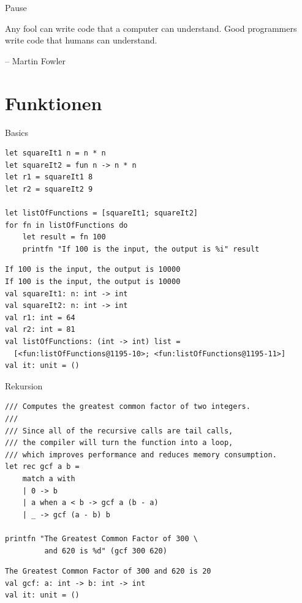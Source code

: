 \documentclass[t]{beamer}
\begin{document}
\begin{frame}[label={sec:org298f164}]{Pause}
\begin{block}{}
Any fool can write code that a computer can understand. 
Good programmers write code that humans can understand.

\null\hfill-- Martin Fowler
\end{block}
\end{frame}


\section{Funktionen }
\label{sec:org93bd31e}

\begin{frame}[label={sec:orgf0461b1},fragile]{Basics}
 \begin{verbatim}
let squareIt1 n = n * n
let squareIt2 = fun n -> n * n
let r1 = squareIt1 8
let r2 = squareIt2 9

let listOfFunctions = [squareIt1; squareIt2]
for fn in listOfFunctions do
    let result = fn 100
    printfn "If 100 is the input, the output is %i" result
\end{verbatim}

\begin{verbatim}
If 100 is the input, the output is 10000
If 100 is the input, the output is 10000
val squareIt1: n: int -> int
val squareIt2: n: int -> int
val r1: int = 64
val r2: int = 81
val listOfFunctions: (int -> int) list =
  [<fun:listOfFunctions@1195-10>; <fun:listOfFunctions@1195-11>]
val it: unit = ()
\end{verbatim}
\end{frame}

\begin{frame}[label={sec:org0dc1ff9},fragile]{Rekursion}
 \begin{verbatim}
/// Computes the greatest common factor of two integers.
///
/// Since all of the recursive calls are tail calls,
/// the compiler will turn the function into a loop,
/// which improves performance and reduces memory consumption.
let rec gcf a b =
    match a with
    | 0 -> b
    | a when a < b -> gcf a (b - a)
    | _ -> gcf (a - b) b

printfn "The Greatest Common Factor of 300 \
         and 620 is %d" (gcf 300 620)
\end{verbatim}

\begin{verbatim}
The Greatest Common Factor of 300 and 620 is 20
val gcf: a: int -> b: int -> int
val it: unit = ()
\end{verbatim}
\end{frame}
\end{document}
